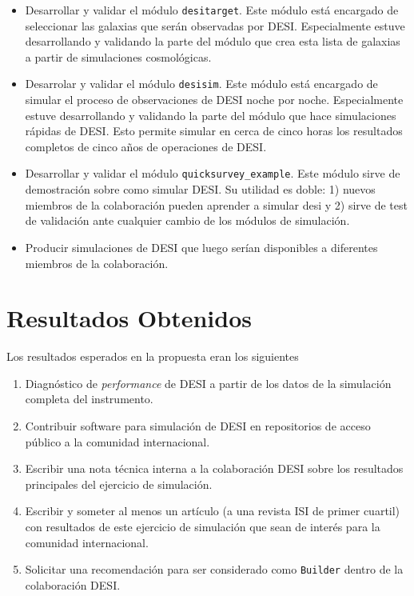 \documentclass[12pt,spanish]{article}
\begin{document}
\begin{itemize}
\item Desarrollar y validar el m\'odulo \verb"desitarget". Este m\'odulo est\'a
  encargado de seleccionar las galaxias que ser\'an observadas por
  DESI.
  Especialmente estuve desarrollando y validando la parte del
  m\'odulo que crea esta lista de galaxias a partir de simulaciones
  cosmol\'ogicas.
\item Desarrolar y validar el m\'odulo \verb"desisim". Este m\'odulo
est\'a encargado de simular el proceso de observaciones de DESI noche
por noche. 
Especialmente estuve desarrollando y validando la parte del m\'odulo
que hace simulaciones r\'apidas de DESI. Esto permite simular en cerca
de cinco horas los resultados completos de cinco a\~nos de operaciones
de DESI.
\item Desarrollar y validar el m\'odulo
  \verb"quicksurvey_example". Este m\'odulo sirve de demostraci\'on
  sobre como simular DESI. Su utilidad es doble: 1) nuevos miembros de
  la colaboraci\'on pueden aprender a simular desi y 2) sirve de test
  de validaci\'on ante cualquier cambio de los m\'odulos de
  simulaci\'on.
\item Producir simulaciones de DESI que luego ser\'ian disponibles a
  diferentes miembros de la colaboraci\'on.
\end{itemize}

\section*{Resultados Obtenidos}

Los resultados esperados en la propuesta eran los siguientes
\begin{enumerate}
\item Diagn\'ostico de \textit{performance} de DESI a partir de los
  datos de la simulaci\'on completa del instrumento.  
\item Contribuir software para simulaci\'on de DESI en repositorios de
  acceso p\'ublico a la comunidad internacional.
\item Escribir una nota t\'ecnica interna a la colaboraci\'on DESI
  sobre los resultados principales del ejercicio de simulaci\'on.
\item Escribir y someter al menos un art\'iculo (a una revista ISI
  de primer cuartil) con resultados de este ejercicio de
  simulaci\'on que sean de inter\'es para la comunidad internacional.  
\item Solicitar una recomendaci\'on para ser   considerado como
  \texttt{Builder}  dentro de la colaboraci\'on DESI.  
 \end{enumerate}
\end{document}
